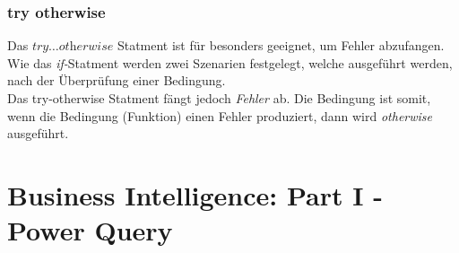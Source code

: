 \subsubsection{try otherwise}
Das $\textit{try}\dots \textit{otherwise}$ Statment ist für besonders geeignet, um Fehler abzufangen. Wie das \textit{if-}Statment werden zwei Szenarien festgelegt, welche ausgeführt werden, nach der Überprüfung einer Bedingung. \\

Das try-otherwise Statment fängt jedoch \textit{Fehler} ab. Die Bedingung ist somit, wenn die Bedingung (Funktion) einen Fehler produziert, dann wird \textit{otherwise} ausgeführt.


\section{Business Intelligence: Part I - Power Query} 
